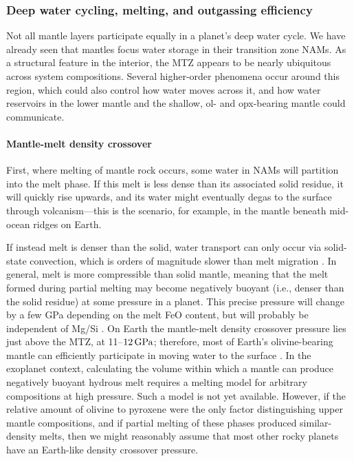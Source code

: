 \subsubsection{Deep water cycling, melting, and outgassing efficiency}\label{sec:discussion-dynamics}


Not all mantle layers participate equally in a planet's deep water cycle. We have already seen that mantles focus water storage in their transition zone NAMs. As a structural feature in the interior, the MTZ appears to be nearly ubiquitous across system compositions. Several higher-order phenomena occur around this region, which could also control how water moves across it, and how water reservoirs in the lower mantle and the shallow, ol- and opx-bearing mantle could communicate.


\paragraph{Mantle-melt density crossover}

First, where melting of mantle rock occurs, some water in NAMs will partition into the melt phase. If this melt is less dense than its associated solid residue, it will quickly rise upwards, and its water might eventually degas to the surface through volcanism---this is the scenario, for example, in the mantle beneath mid-ocean ridges on Earth. 

If instead melt is denser than the solid, water transport can only occur via solid-state convection, which is orders of magnitude slower \citep[not more than metres per year;][]{ricard_physics_2015} than melt migration \citep[$\sim$30$\,{\rm m}\,{\rm yr}^{-1}$;][]{katz_physics_2022}. In general, melt is more compressible than solid mantle, meaning that the melt formed during partial melting may become negatively buoyant (i.e., denser than the solid residue) at some pressure in a planet. This precise pressure will change by a few GPa depending on the melt FeO content, but will probably be independent of Mg/Si \citep{ohtani_melting_1995, agee_compressibility_2008}. On Earth the mantle-melt density crossover pressure lies just above the MTZ, at 11--$12\,{\rm GPa}$; therefore, most of Earth's olivine-bearing mantle can efficiently participate in moving water to the surface \citep{andrault_mantle_2022}. In the exoplanet context, calculating the volume within which a mantle can produce negatively buoyant hydrous melt requires a melting model for arbitrary compositions at high pressure. Such a model is not yet available. However, if the relative amount of olivine to pyroxene were the only factor distinguishing upper mantle compositions, and if partial melting of these phases produced similar-density melts, then we might reasonably assume that most other rocky planets have an Earth-like density crossover pressure.

